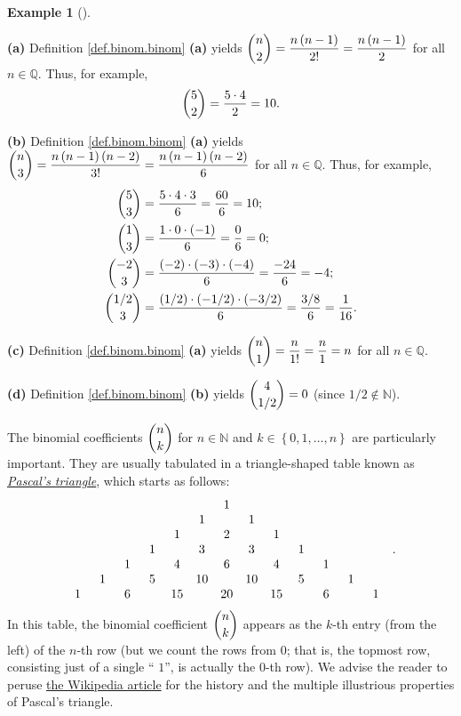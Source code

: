 \documentclass[numbers=enddot,12pt,final,onecolumn,notitlepage]{scrartcl}%
\numberwithin{exer}{subsection}
\theoremstyle{definition}
\newtheorem{exam}[theo]{Example}
\newenvironment{example}[1][]
{\begin{exam}[#1]\begin{leftbar}}
{\end{leftbar}\end{exam}}
\begin{document}
\begin{example}
\textbf{(a)} Definition \ref{def.binom.binom} \textbf{(a)} yields $\dbinom
{n}{2}=\dfrac{n\left(  n-1\right)  }{2!}=\dfrac{n\left(  n-1\right)  }{2}$ for
all $n\in\mathbb{Q}$. Thus, for example,%
\[
\dbinom{5}{2}=\dfrac{5\cdot4}{2}=10.
\]


\textbf{(b)} Definition \ref{def.binom.binom} \textbf{(a)} yields $\dbinom
{n}{3}=\dfrac{n\left(  n-1\right)  \left(  n-2\right)  }{3!}=\dfrac{n\left(
n-1\right)  \left(  n-2\right)  }{6}$ for all $n\in\mathbb{Q}$. Thus, for
example,%
\begin{align*}
\dbinom{5}{3}  &  =\dfrac{5\cdot4\cdot3}{6}=\dfrac{60}{6}=10;\\
\dbinom{1}{3}  &  =\dfrac{1\cdot0\cdot\left(  -1\right)  }{6}=\dfrac{0}%
{6}=0;\\
\dbinom{-2}{3}  &  =\dfrac{\left(  -2\right)  \cdot\left(  -3\right)
\cdot\left(  -4\right)  }{6}=\dfrac{-24}{6}=-4;\\
\dbinom{1/2}{3}  &  =\dfrac{\left(  1/2\right)  \cdot\left(  -1/2\right)
\cdot\left(  -3/2\right)  }{6}=\dfrac{3/8}{6}=\dfrac{1}{16}.
\end{align*}


\textbf{(c)} Definition \ref{def.binom.binom} \textbf{(a)} yields $\dbinom
{n}{1}=\dfrac{n}{1!}=\dfrac{n}{1}=n$ for all $n\in\mathbb{Q}$.

\textbf{(d)} Definition \ref{def.binom.binom} \textbf{(b)} yields $\dbinom
{4}{1/2}=0$ (since $1/2\notin\mathbb{N}$).
\end{example}

The binomial coefficients $\dbinom{n}{k}$ for $n\in\mathbb{N}$ and
$k\in\left\{  0,1,\ldots,n\right\}  $ are particularly important. They are
usually tabulated in a triangle-shaped table known as
\textit{\href{https://en.wikipedia.org/wiki/Pascal's_triangle}{\textit{Pascal's
triangle}}}, which starts as follows:%
\[%
\begin{array}
[c]{ccccccccccccc}%
\phantom{15} & \phantom{15} & \phantom{15} & \phantom{15} & \phantom{15} &
\phantom{15} & 1 & \phantom{15} & \phantom{15} & \phantom{15} & \phantom{15} &
\phantom{15} & \phantom{15}\\
&  &  &  &  & 1 &  & 1 &  &  &  &  & \\
&  &  &  & 1 &  & 2 &  & 1 &  &  &  & \\
&  &  & 1 &  & 3 &  & 3 &  & 1 &  &  & \\
&  & 1 &  & 4 &  & 6 &  & 4 &  & 1 &  & \\
& 1 &  & 5 &  & 10 &  & 10 &  & 5 &  & 1 & \\
1 &  & 6 &  & 15 &  & 20 &  & 15 &  & 6 &  & 1
\end{array}
\ .
\]
In this table, the binomial coefficient $\dbinom{n}{k}$ appears as the $k$-th
entry (from the left) of the $n$-th row (but we count the rows from $0$; that
is, the topmost row, consisting just of a single \textquotedblleft%
$1$\textquotedblright, is actually the $0$-th row). We advise the reader to
peruse \href{https://en.wikipedia.org/wiki/Pascal's_triangle}{the Wikipedia
article} for the history and the multiple illustrious properties of Pascal's triangle.
\end{document}
